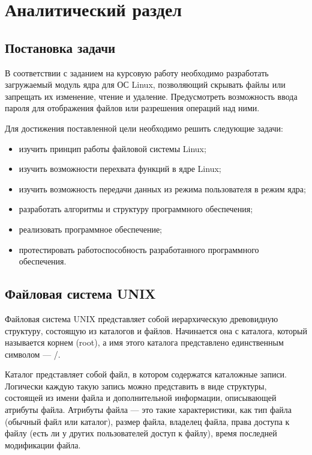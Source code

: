 \chapter{Аналитический раздел}
\label{cha:analysis}

\section{Постановка задачи}

В соответствии с заданием на курсовую работу необходимо разработать загружаемый модуль ядра для ОС Linux, позволяющий скрывать файлы или запрещать их изменение, чтение и удаление. Предусмотреть возможность ввода пароля для отображения файлов или разрешения операций над ними.

Для достижения поставленной цели необходимо решить следующие задачи:

\begin{itemize}
	\item изучить принцип работы файловой системы Linux;
	\item изучить возможности перехвата функций в ядре Linux;
	\item изучить возможность передачи данных из режима пользователя в режим ядра;
	\item разработать алгоритмы и структуру программного обеспечения;
	\item реализовать программное обеспечение;
	\item протестировать работоспособность разработанного программного обеспечения.
\end{itemize}

\section{Файловая система UNIX}

Файловая система UNIX представляет собой иерархическую древовидную структуру, состоящую из каталогов и файлов. Начинается она с каталога, который называется корнем (root), а имя этого каталога представлено единственным символом --- /.

Каталог представляет собой файл, в котором содержатся каталожные записи. Логически каждую такую запись можно представить в виде структуры, состоящей из имени файла и дополнительной информации, описывающей атрибуты файла. Атрибуты файла --- это такие характеристики, как тип файла (обычный файл или каталог), размер файла, владелец файла, права доступа к файлу (есть ли у других пользователей доступ к файлу), время последней модификации файла.


